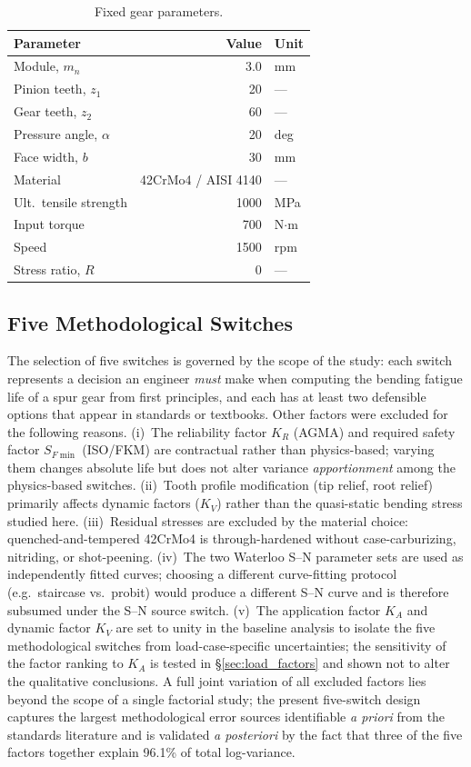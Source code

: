 \documentclass[twocolumn,12pt,a4paper]{article}
\begin{document}
\begin{table}[h]
\centering
\caption{Fixed gear parameters.}
\label{tab:gear}
\footnotesize
\begin{tabular}{p{2.9cm} r l}
\toprule
Parameter & Value & Unit \\
\midrule
Module, $m_n$ & 3.0 & mm \\
Pinion teeth, $z_1$ & 20 & --- \\
Gear teeth, $z_2$ & 60 & --- \\
Pressure angle, $\alpha$ & 20 & deg \\
Face width, $b$ & 30 & mm \\
Material & 42CrMo4 / AISI 4140 & --- \\
Ult.\ tensile strength & 1000 & MPa \\
Input torque & 700 & N$\cdot$m \\
Speed & 1500 & rpm \\
Stress ratio, $R$ & 0 & --- \\
\bottomrule
\end{tabular}
\end{table}

\subsection{Five Methodological Switches}

The selection of five switches is governed by the scope of the study:
each switch represents a decision an engineer \emph{must} make when
computing the bending fatigue life of a spur gear from first
principles, and each has at least two defensible options that appear in
standards or textbooks. Other factors were excluded for the following
reasons. (i)~The reliability factor $K_R$ (AGMA) and required safety
factor $S_{F\min}$ (ISO/FKM) are contractual rather than
physics-based; varying them changes absolute life but does not alter
variance \emph{apportionment} among the physics-based switches.
(ii)~Tooth profile modification (tip relief, root relief) primarily
affects dynamic factors ($K_V$) rather than the quasi-static bending
stress studied here. (iii)~Residual stresses are excluded by the
material choice: quenched-and-tempered 42CrMo4 is through-hardened
without case-carburizing, nitriding, or shot-peening.
(iv)~The two Waterloo S--N parameter sets are used as independently
fitted curves; choosing a different curve-fitting protocol (e.g.\
staircase vs.\ probit) would produce a different S--N curve and is
therefore subsumed under the S--N source switch.
(v)~The application factor $K_A$ and dynamic factor $K_V$ are set to
unity in the baseline analysis to isolate the five methodological
switches from load-case-specific uncertainties; the sensitivity of the
factor ranking to $K_A$ is tested in \S\ref{sec:load_factors} and
shown not to alter the qualitative conclusions. A full joint variation
of all excluded factors lies beyond the scope of a single factorial
study; the present five-switch design captures the largest
methodological error sources identifiable \emph{a priori} from the
standards literature and is validated \emph{a posteriori} by the fact
that three of the five factors together explain 96.1\% of total
log-variance.
\end{document}
